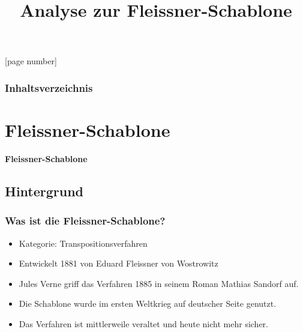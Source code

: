 \documentclass{beamer}
\begin{document}
\title{Analyse zur Fleissner-Schablone}  
\date{} 

[page number]
\begin{frame}
\titlepage
\end{frame} 

\begin{frame}
\frametitle{Inhaltsverzeichnis}\tableofcontents
\end{frame} 


\section{Fleissner-Schablone} 
\begin{frame}
\begin{center}
\textbf{\huge Fleissner-Schablone}
\end{center}
\end{frame}

\subsection{Hintergrund}
\begin{frame}
\frametitle{Was ist die Fleissner-Schablone?} 
\begin{itemize}
\item Kategorie: Transpositionsverfahren
\item Entwickelt 1881 von Eduard Fleissner von Wostrowitz
\item Jules Verne griff das Verfahren 1885 in seinem Roman \glqq Mathias Sandorf\grqq{} auf.
\item Die Schablone wurde im ersten Weltkrieg auf deutscher Seite genutzt.
\item Das Verfahren ist mittlerweile veraltet und heute nicht mehr sicher.
\end{itemize}
\end{frame}
\end{document}
